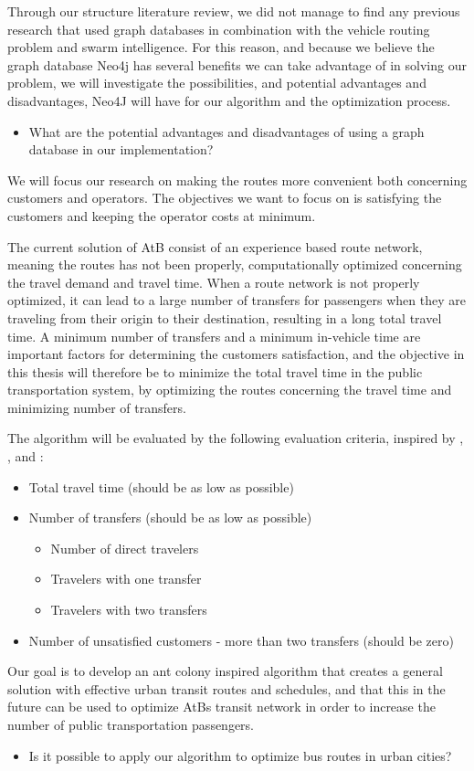 Through our structure literature review, we did not manage to find any previous research that used graph databases in combination with the vehicle routing problem and swarm intelligence. For this reason, and because we believe the graph database Neo4j \citep{website:neo4j} has several benefits we can take advantage of in solving our problem, we will investigate the possibilities, and potential advantages and disadvantages, Neo4J will have for our algorithm and the optimization process.
\begin{itemize}
\item What are the potential advantages and disadvantages of using a graph database in our implementation?
\end{itemize}

We will focus our research on making the routes more convenient both concerning customers and operators. The objectives we want to focus on is satisfying the customers and keeping the operator costs at minimum. 

The current solution of AtB \citep{website:atb} consist of an experience based route network, meaning the routes has not been properly, computationally optimized concerning the travel demand and travel time. When a route network is not properly optimized, it can lead to a large number of transfers for passengers when they are traveling from their origin to their destination, resulting in a long total travel time. A minimum number of transfers and a minimum in-vehicle time are important factors for determining the customers satisfaction, and the objective in this thesis will therefore be to minimize the total travel time in the public transportation system, by optimizing the routes concerning the travel time and minimizing number of transfers. %

The algorithm will be evaluated by the following evaluation criteria, inspired by \citep{kechagiopoulos14}, \citep{mandl80}, \citep{nikolic14} and \citep{fan09}: 
\begin{itemize}
\item Total travel time (should be as low as possible)
\item Number of transfers (should be as low as possible)
\begin{itemize}
\item Number of direct travelers
\item Travelers with one transfer
\item Travelers with two transfers
\end{itemize}
\item Number of unsatisfied customers - more than two transfers (should be zero)
\end{itemize}

Our goal is to develop an ant colony inspired algorithm that creates a general solution with effective urban transit routes and schedules, and that this in the future can be used to optimize AtBs transit network in order to increase the number of public transportation passengers. 
\begin{itemize}
\item Is it possible to apply our algorithm to optimize bus routes in urban cities?
\end{itemize}
